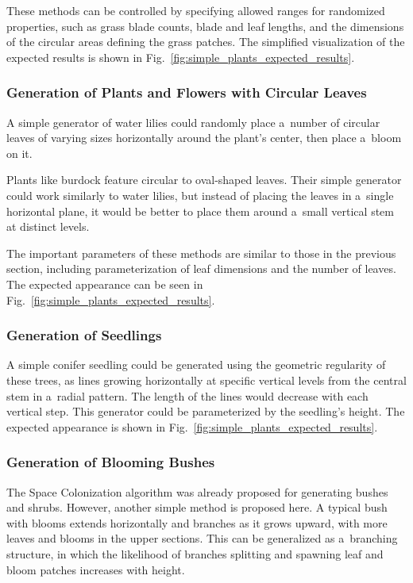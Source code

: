 These methods can be controlled by specifying allowed ranges for randomized properties, such as grass blade counts, blade and leaf lengths, and the dimensions of the circular areas defining the grass patches. The simplified visualization of the expected results is shown in Fig.~\ref{fig:simple_plants_expected_results}.

\subsubsection{Generation of Plants and Flowers with Circular Leaves}
A simple generator of water lilies could randomly place a~number of circular leaves of varying sizes horizontally around the plant's center, then place a~bloom on it.

Plants like burdock feature circular to oval-shaped leaves. Their simple generator could work similarly to water lilies, but instead of placing the leaves in a~single horizontal plane, it would be better to place them around a~small vertical stem at distinct levels.

The important parameters of these methods are similar to those in the previous section, including parameterization of leaf dimensions and the number of leaves. The expected appearance can be seen in Fig.~\ref{fig:simple_plants_expected_results}.



\subsubsection{Generation of Seedlings}
A simple conifer seedling could be generated using the geometric regularity of these trees, as lines growing horizontally at specific vertical levels from the central stem in a~radial pattern. The length of the lines would decrease with each vertical step. This generator could be parameterized by the seedling's height. The expected appearance is shown in Fig.~\ref{fig:simple_plants_expected_results}.

\subsubsection{Generation of Blooming Bushes}
The Space Colonization algorithm was already proposed for generating bushes and shrubs. However, another simple method is proposed here. A typical bush with blooms extends horizontally and branches as it grows upward, with more leaves and blooms in the upper sections. This can be generalized as a~branching structure, in which the likelihood of branches splitting and spawning leaf and bloom patches increases with height. 

